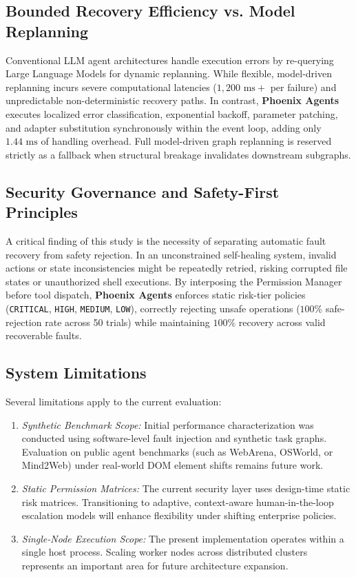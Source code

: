 \documentclass[conference]{IEEEtran}
\begin{document}
\subsection{Bounded Recovery Efficiency vs. Model Replanning}
Conventional LLM agent architectures handle execution errors by re-querying Large Language Models for dynamic replanning. While flexible, model-driven replanning incurs severe computational latencies ($1,200\text{ ms}+$ per failure) and unpredictable non-deterministic recovery paths. In contrast, \textbf{Phoenix Agents} executes localized error classification, exponential backoff, parameter patching, and adapter substitution synchronously within the event loop, adding only $1.44\text{ ms}$ of handling overhead. Full model-driven graph replanning is reserved strictly as a fallback when structural breakage invalidates downstream subgraphs.

\subsection{Security Governance and Safety-First Principles}
A critical finding of this study is the necessity of separating automatic fault recovery from safety rejection. In an unconstrained self-healing system, invalid actions or state inconsistencies might be repeatedly retried, risking corrupted file states or unauthorized shell executions. By interposing the Permission Manager before tool dispatch, \textbf{Phoenix Agents} enforces static risk-tier policies (\texttt{CRITICAL}, \texttt{HIGH}, \texttt{MEDIUM}, \texttt{LOW}), correctly rejecting unsafe operations ($100\%$ safe-rejection rate across 50 trials) while maintaining $100\%$ recovery across valid recoverable faults.

\subsection{System Limitations}
Several limitations apply to the current evaluation:
\begin{enumerate}
    \item \textit{Synthetic Benchmark Scope:} Initial performance characterization was conducted using software-level fault injection and synthetic task graphs. Evaluation on public agent benchmarks (such as WebArena, OSWorld, or Mind2Web) under real-world DOM element shifts remains future work.
    \item \textit{Static Permission Matrices:} The current security layer uses design-time static risk matrices. Transitioning to adaptive, context-aware human-in-the-loop escalation models will enhance flexibility under shifting enterprise policies.
    \item \textit{Single-Node Execution Scope:} The present implementation operates within a single host process. Scaling worker nodes across distributed clusters represents an important area for future architecture expansion.
\end{enumerate}
\end{document}
